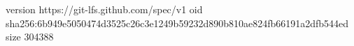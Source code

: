 version https://git-lfs.github.com/spec/v1
oid sha256:6b949e5050474d3525c26c3e1249b59232d890b810ae824fb66191a2dfb544ed
size 304388
